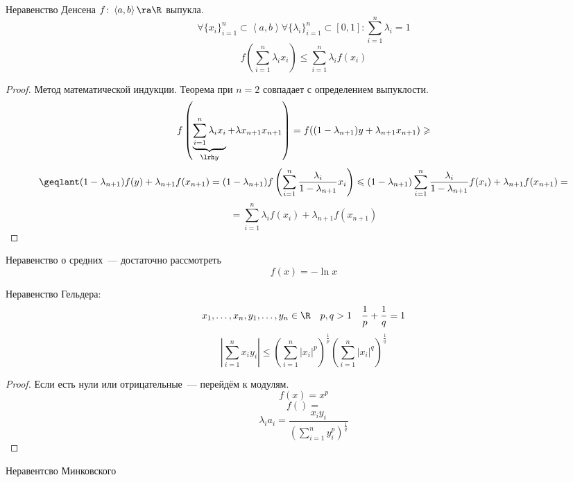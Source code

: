 \begin{theorem}{Неравенство Денсена}
$f\colon \left<a, b\right> \ra \R$ выпукла.
$$\forall \{x_i\}_{i=1}^n \subset \left<a, b\right> \forall \{\lambda_i\}_{i=1}^n \subset [0, 1]\colon \sum_{i=1}^n \lambda_i = 1$$
$$f\left(\sum_{i=1}^n \lambda_i x_i\right) \leqslant \sum_{i=1}^n \lambda_i f(x_i)$$ 
\end{theorem}
\begin{proof}
Метод математической индукции. Теорема при $n = 2$ совпадает с определением выпуклости.
$$f\left(\underbrace{\sum_{i=1}^n \lambda_i x_i}_{\lrh y} + \lambda x_{n+1} x_{n+1}\right) = f((1 - \lambda_{n+1})y + \lambda_{n+1} x_{n+1}) \geqslant $$
$$ \geqlant (1-\lambda_{n+1}) f(y) + \lambda_{n+1} f(x_{n+1}) = (1 - \lambda_{n+1}) f\left(\sum_{i=1}^n \frac{\lambda_i}{1 - \lambda_{n+1}} x_i\right) \leqslant (1 - \lambda_{n+1}) \sum_{i=1}^n \frac{\lambda_i}{1-\lambda_{n+1}} f(x_i) + \lambda_{n+1} f(x_{n+1}) = $$
$$= \sum_{i=1}^n \lambda_i f(x_i) + \lambda_{n+1} f(x_{n+1})$$
\end{proof}

\begin{conseq}
Неравенство о средних~--- достаточно рассмотреть $$f(x) = -\ln x$$
\end{conseq}
\begin{conseq}
Неравенство Гельдера:
$$x_1, \ldots, x_n, y_1, \ldots, y_n \in \R \quad p,q > 1 \quad \frac1p + \frac1q = 1$$
$$\left|\sum_{i=1}^n x_iy_i\right| \leqslant \left(\sum_{i=1}^n |x_i|^p\right)^{\frac1p} \left(\sum_{i=1}^n |x_i|^q\right)^{\frac1q}$$
\end{conseq}
\begin{proof}
Если есть нули или отрицательные~--- перейдём к модулям.
$$f(x) = x^p$$
$$f\left(  \right) = $$
$$ \lambda_i a_i = \frac{x_iy_i}{(\sum_{i=1}^n y_i^p) ^ {\frac1q}}$$
\end{proof}

\begin{conseq}
Неравентсво Минковского
\end{conseq}